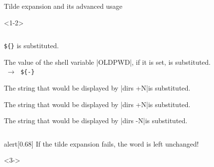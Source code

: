 \begin{frame}[fragile]{Tilde expansion and its advanced usage}
    \vspace*{-3mm}
    \begin{overlayarea}{\textwidth}{0.65\textheight}
        \begin{onlyenv}<1-2>
            \vspace{-4mm}
            \begin{columns}
                \begin{column}{\dimexpr\paperwidth-10mm}
                    \begin{description}%
                        \setlength{\itemsep}{2mm}
                        \item[\texttt{\textasciitilde+}]
                            \texttt{\$\{\}} is substituted.
                        \item[\texttt{\textasciitilde-}]
                            The value of the shell variable \bash|OLDPWD|, if it is set, is substituted.\\
                            $\;\to\;$ \texttt{\$\{-\}}
                        \item[\texttt{\textasciitilde N}]
                            The string that would be displayed by \enspace\bash|dirs +N|\enspace is substituted.
                        \item[\texttt{\textasciitilde+N}]
                            The string that would be displayed by \enspace\bash|dirs +N|\enspace is substituted.
                        \item[\texttt{\textasciitilde-N}]
                            The string that would be displayed by \enspace\bash|dirs -N|\enspace is substituted.
                    \end{description}
                \end{column}
            \end{columns}
            \vspace{2mm}
            \begin{varblock}{alert}[0.68\textwidth]{}
                \large\alert{If the tilde expansion fails, the word is left unchanged!}
            \end{varblock}
        \end{onlyenv}
        \begin{onlyenv}<3->

\end{onlyenv}
\end{overlayarea}
\end{frame}
